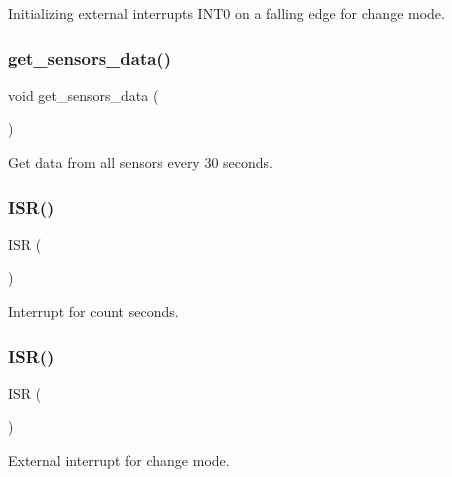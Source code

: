 Initializing external interrupts I\+N\+T0 on a falling edge for change mode. 

\mbox{\label{main_8c_aba1abcad1a688918cd10ef294772b13b}} 
\subsubsection{get\+\_\+sensors\+\_\+data()}
{\footnotesize\ttfamily void get\+\_\+sensors\+\_\+data (\begin{DoxyParamCaption}{ }\end{DoxyParamCaption})}



Get data from all sensors every 30 seconds. 

\mbox{\label{main_8c_ab16889ae984b9b798989a0d239283cac}} 
\subsubsection{I\+S\+R()\hspace{0.1cm}{\footnotesize\ttfamily [1/2]}}
{\footnotesize\ttfamily I\+SR (\begin{DoxyParamCaption}\item[{T\+I\+M\+E\+R1\+\_\+\+O\+V\+F\+\_\+vect}]{ }\end{DoxyParamCaption})}



Interrupt for count seconds. 

\mbox{\label{main_8c_afea150fcd685610cb9f7672fce361e53}} 
\subsubsection{I\+S\+R()\hspace{0.1cm}{\footnotesize\ttfamily [2/2]}}
{\footnotesize\ttfamily I\+SR (\begin{DoxyParamCaption}\item[{I\+N\+T0\+\_\+vect}]{ }\end{DoxyParamCaption})}



External interrupt for change mode. 

\mbox{\label{main_8c_a19eec5f2cd52a46b15783f9f18e9e4c9}} 
